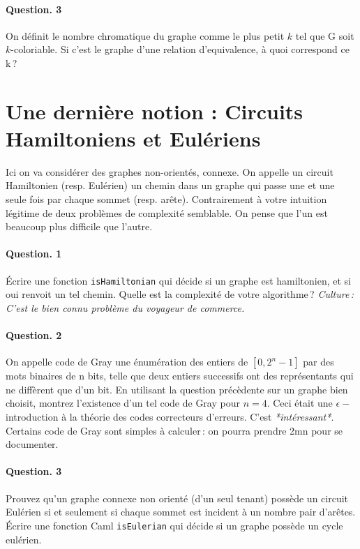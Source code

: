\documentclass[10pt,a4paper]{article}
\begin{document}
\paragraph{Question. 3\\}
On définit le nombre chromatique du graphe comme le plus petit $k$ tel que
G soit $k$-coloriable. Si c'est le graphe d'une relation d'equivalence, à quoi
correspond ce k\,?

\section{Une dernière notion : Circuits Hamiltoniens et Eulériens}
Ici on va considérer des graphes non-orientés, connexe.
On appelle un circuit Hamiltonien (resp. Eulérien) un chemin dans un graphe qui passe une
et une seule fois par chaque sommet (resp. arête). Contrairement à votre
intuition légitime de deux problèmes de complexité semblable. On pense
que l'un est beaucoup plus difficile que l'autre. 

\paragraph{Question. 1\\} Écrire une fonction \texttt{isHamiltonian} qui
décide si un graphe est hamiltonien, et si oui renvoit un tel chemin.
Quelle est la complexité de votre algorithme\,? \emph{Culture\,: C'est le
bien connu problème du voyageur de commerce.}

\paragraph{Question. 2\\}
On appelle code de Gray une énumération des entiers de $[0,2^n-1]$ par
des mots binaires de n bits, telle que deux entiers successifs ont des
représentants qui ne diffèrent que d'un bit. En utilisant la question
précèdente sur un graphe bien choisit,  montrez l'existence d'un tel code
de Gray pour $n=4$. Ceci était une $\epsilon-$introduction à la théorie
des codes correcteurs d'erreurs. C'est \emph{*intéressant*}. Certains
code de Gray sont simples à calculer\,: on pourra prendre 2mn pour se
documenter.

\paragraph{Question. 3\\} Prouvez qu'un graphe connexe non orienté (d'un seul tenant) possède un circuit
Eulérien si et seulement si chaque sommet est incident à un nombre pair
d'arêtes. Écrire une fonction Caml \texttt{isEulerian} qui décide si un graphe possède un
cycle eulérien. 
\end{document}
